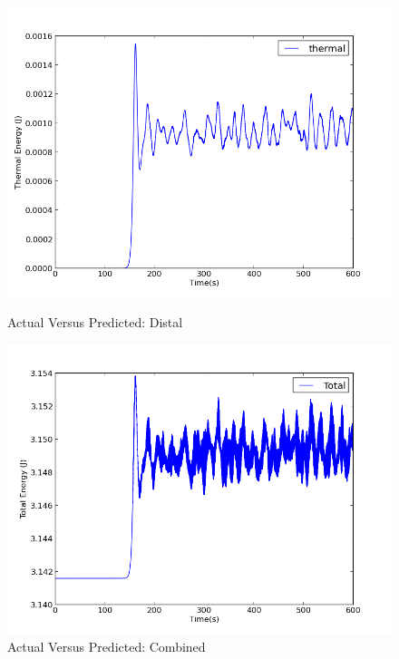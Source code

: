 \documentclass[12pt]{article}
\begin{document}
\begin{figure}
\vspace*{0.5cm} %
\begin{minipage}[t]{0.45\textwidth}
\includegraphics[width=\linewidth]{ThermalEnergy.png}
\caption{Actual Versus Predicted: Distal}
\label{fig:distal}
\end{minipage}
\hspace{\fill}
\begin{minipage}[t]{0.45\textwidth}
\includegraphics[width=\linewidth]{TotalEnergy.png}
\caption{Actual Versus Predicted: Combined}
\label{fig:combined}
\end{minipage}

\end{figure}
\end{document}
